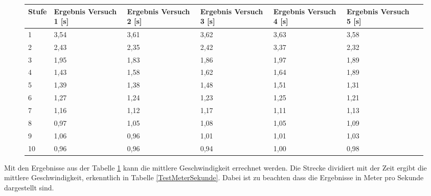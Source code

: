 \begin{figure}[H]
\begin{center}
	\fontsize{8}{10}\selectfont
	\begin{tabularx}{\linewidth}{|p{0.8cm}|X|X|X|X|X|X|}
		\hline 
		\textbf{Stufe} & \textbf{Ergebnis Versuch 1 [s]} & \textbf{Ergebnis Versuch 2 [s]} & \textbf{Ergebnis Versuch 3 [s]}& \textbf{Ergebnis Versuch 4 [s]} & \textbf{Ergebnis Versuch 5 [s]} \\ \hline
		
		1 & 3,54 & 3,61 & 3,62 & 3,63 & 3,58 \\ \hline
		2 & 2,43 & 2,35 & 2,42 & 3,37 & 2,32 \\ \hline
		3 & 1,95 & 1,83 & 1,86 & 1,97 & 1,89 \\ \hline
		4 & 1,43 & 1,58 & 1,62 & 1,64 & 1,89 \\ \hline
		5 & 1,39 & 1,38 & 1,48 & 1,51 & 1,31 \\ \hline
		6 & 1,27 & 1,24 & 1,23 & 1,25 & 1,21 \\ \hline
		7 & 1,16 & 1,12 & 1,17 & 1,11 & 1,13 \\ \hline
		8 & 0,97 & 1,05 & 1,08 & 1,05 & 1,09 \\ \hline
		9 & 1,06 & 0,96 & 1,01 & 1,01 & 1,03 \\ \hline
		10 & 0,96 & 0,96 & 0,94 & 1,00 & 0,98 \\ \hline
		
		\end{tabularx}
			\label{TestZeitTab}
		\end{center}
\end{figure}

Mit den Ergebnisse aus der Tabelle \ref{TestZeitTab} kann die mittlere Geschwindigkeit errechnet werden. Die Strecke dividiert mit der Zeit ergibt die mittlere Geschwindigkeit, erkenntlich in Tabelle \ref{TestMeterSekunde}. Dabei ist zu beachten dass die Ergebnisse in Meter pro Sekunde dargestellt sind. 

